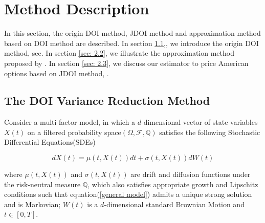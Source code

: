 \chapter{Method Description}

In this section, the origin DOI method, JDOI method and approximation method based on DOI method are described. In section \ref{sec: 2.1},, we introduce the origin DOI method, see\cite{heath_monte_nodate}. In section \ref{sec: 2.2}, we illustrate the approximation method proposed by \cite{kristensen_adding_2011}. In section \ref{sec: 2.3}, we discuss our estimator to price American options based on JDOI method, \cite{auster_jdoi_2021}.

\section{The DOI Variance Reduction Method}
\label{sec: 2.1}

Consider a multi-factor model, in which a $d$-dimensional vector of state variables $X(t)$ on a filtered probability space$(\Omega,\mathcal F, \mathbb Q)$ satisfies the following Stochastic Differential Equations(SDEs)

\begin{equation}\label{general model}
    dX(t) = \mu(t, X(t)) dt + \sigma(t, X(t)) dW(t)
\end{equation}

\noindent where $\mu(t,X(t))$ and $\sigma(t, X(t))$ are drift and diffusion functions under the risk-neutral measure $\mathbb Q$, which also satisfies appropriate growth and Lipschitz conditions such that equation(\ref{general model}) admits a unique strong solution and is Markovian; $W(t)$ is a $d$-dimensional standard Brownian Motion and $t \in [0,T]$.





